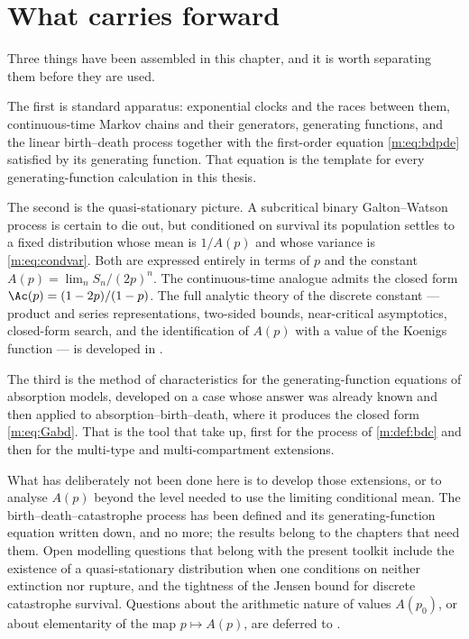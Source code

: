 \section{What carries forward}
\label{m:sec:summary}

Three things have been assembled in this chapter, and it is worth separating them
before they are used.

The first is standard apparatus: exponential clocks and the races between them,
continuous-time Markov chains and their generators, generating functions, and the
linear birth--death process together with the first-order equation
\cref{m:eq:bdpde} satisfied by its generating function. That equation is the template
for every generating-function calculation in this thesis.

The second is the quasi-stationary picture. A subcritical binary Galton--Watson
process is certain to die out, but conditioned on survival its population settles
to a fixed distribution whose mean is $1/A(p)$ and whose variance is
\cref{m:eq:condvar}. Both are expressed entirely in terms of $p$ and the constant
$A(p) = \lim_n S_n/(2p)^n$. The continuous-time analogue admits the closed form
$\Ac(p)=(1-2p)/(1-p)$. The full analytic theory of the discrete constant ---
product and series representations, two-sided bounds, near-critical asymptotics,
closed-form search, and the identification of $A(p)$ with a value of the Koenigs
function --- is developed in \ChA.

The third is the method of characteristics for the generating-function equations of
absorption models, developed on a case whose answer was already known and then
applied to absorption--birth--death, where it produces the closed form
\cref{m:eq:Gabd}. That is the tool that
 take up, first
for the process of \cref{m:def:bdc} and then for the multi-type and multi-compartment
extensions.

What has deliberately not been done here is to develop those extensions, or to
analyse $A(p)$ beyond the level needed to use the limiting conditional mean. The
birth--death--catastrophe process has been defined and its generating-function
equation written down, and no more; the results belong to the chapters that need
them. Open modelling questions that belong with the present toolkit include the
existence of a quasi-stationary distribution when one conditions on neither
extinction nor rupture, and the tightness of the Jensen bound for discrete
catastrophe survival. Questions about the arithmetic nature of values $A(p_0)$, or
about elementarity of the map $p\mapsto A(p)$, are deferred to \ChA.
